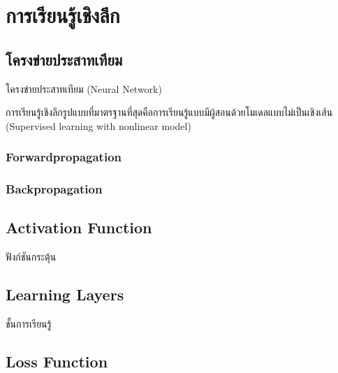 

\chapter{การเรียนรู้เชิงลึก}
\label{ch:dl}

\section{โครงข่ายประสาทเทียม}

โครงข่ายประสาทเทียม (Neural Network)

การเรียนรู้เชิงลึกรูปแบบที่มาตรฐานที่สุดคือการเรียนรู้แบบมีผู้สอนด้วยโมเดลแบบไม่เป็นเชิงเส้น (Supervised learning with nonlinear model)

\subsection{Forwardpropagation}

\subsection{Backpropagation}

\section{Activation Function}

ฟังก์ชันกระตุ้น

\section{Learning Layers}

ชั้นการเรียนรู้

\section{Loss Function}

